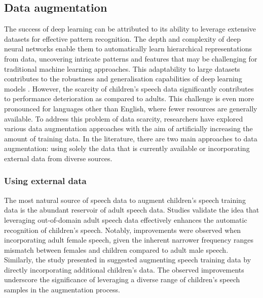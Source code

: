 \subsection{Data augmentation}%
The success of deep learning can be attributed to its ability to leverage extensive datasets for effective pattern recognition. The depth and complexity of deep neural networks enable them to automatically learn hierarchical representations from data, uncovering intricate patterns and features that may be challenging for traditional machine learning approaches. This adaptability to large datasets contributes to the robustness and generalisation capabilities of deep learning models
. However, the scarcity of children's speech data significantly contributes to performance deterioration as compared to adults. This challenge is even more pronounced for languages other than English, where fewer resources are generally available. To address this problem of data scarcity, researchers have explored various data augmentation approaches with the aim of artificially increasing the amount of training data. In the literature, there are two main approaches to data augmentation: using solely the data that is currently available or incorporating external data from diverse sources.

\subsubsection{Using external data}
The most natural source of speech data to augment children's speech training data is the abundant reservoir of adult speech data. Studies \cite{adultAUGMENT1, adultAUGMENT2} validate the idea that leveraging out-of-domain adult speech data effectively enhances the automatic recognition of children's speech. Notably, improvements were observed when incorporating adult female speech, given the inherent narrower frequency ranges mismatch between females and children compared to adult male speech.
Similarly, the study presented in \cite{nonnative} suggested augmenting speech training data by directly incorporating additional children's data. The observed improvements underscore the significance of leveraging a diverse range of children's speech samples in the augmentation process.


